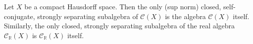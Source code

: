 Let $X$ be a compact Hausdorff space. Then the only (sup norm) closed, self-conjugate, strongly separating subalgebra of $\mathcal{C}(X)$ is the algebra $\mathcal{C}(X)$ itself. Similarly, the only closed, strongly separating subalgebra of the real algebra $\mathcal{C}_{\mathbb{R}}(X)$ is $\mathcal{C}_{\mathbb{R}}(X)$ itself.
